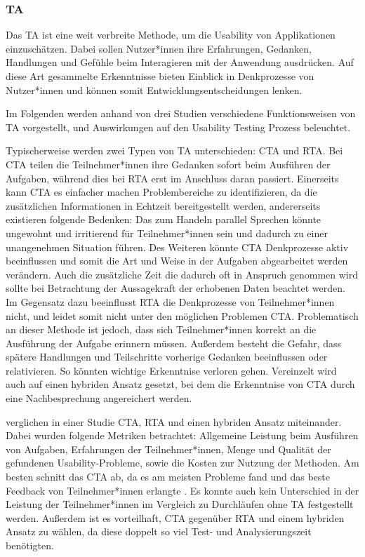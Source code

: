 \parencite{barnumUsabilityTesting2021}

\subsubsection{\acl{TA}}
Das \ac{TA} ist eine weit verbreite Methode, um die Usability von Applikationen einzuschätzen. Dabei sollen Nutzer*innen ihre Erfahrungen, Gedanken, Handlungen und Gefühle beim Interagieren mit der Anwendung ausdrücken. Auf diese Art gesammelte Erkenntnisse  bieten Einblick in Denkprozesse von Nutzer*innen und können somit Entwicklungsentscheidungen lenken.
\parencite{alhadretiRethinkingThinking2018}

Im Folgenden werden anhand von drei Studien verschiedene Funktionsweisen von \ac{TA} vorgestellt, und Auswirkungen auf den Usability Testing Prozess beleuchtet.

Typischerweise werden zwei Typen von \ac{TA} unterschieden: \ac{CTA} und \ac{RTA}. Bei \ac{CTA} teilen die Teilnehmer*innen ihre Gedanken sofort beim Ausführen der Aufgaben, während dies bei \ac{RTA} erst im Anschluss daran passiert. Einerseits kann \ac{CTA} es einfacher machen Problembereiche zu identifizieren, da die zusätzlichen Informationen in Echtzeit bereitgestellt werden, andererseits existieren folgende Bedenken: Das zum Handeln parallel Sprechen könnte ungewohnt und irritierend für Teilnehmer*innen sein und dadurch zu einer unangenehmen Situation führen. Des Weiteren könnte \ac{CTA} Denkprozesse aktiv beeinflussen und somit die Art und Weise in der Aufgaben abgearbeitet werden verändern. Auch die zusätzliche Zeit die dadurch oft in Anspruch genommen wird sollte bei Betrachtung der Aussagekraft der erhobenen Daten beachtet werden.  Im Gegensatz dazu beeinflusst \ac{RTA} die Denkprozesse von Teilnehmer*innen nicht, und leidet somit nicht unter den möglichen Problemen \ac{CTA}. Problematisch an dieser Methode ist jedoch, dass sich Teilnehmer*innen korrekt an die Ausführung der Aufgabe erinnern müssen. Außerdem besteht die Gefahr, dass spätere Handlungen und Teilschritte vorherige Gedanken beeinflussen oder relativieren. So könnten wichtige Erkenntnise verloren gehen. Vereinzelt wird auch auf einen hybriden Ansatz gesetzt, bei dem die Erkenntnise von \ac{CTA} durch eine Nachbesprechung angereichert werden. \cite{alhadretiRethinkingThinking2018}

\textcite{alhadretiRethinkingThinking2018} verglichen in einer Studie \ac{CTA}, \ac{RTA} und einen hybriden Ansatz miteinander. Dabei wurden folgende Metriken betrachtet: Allgemeine Leistung beim Ausführen von Aufgaben, Erfahrungen der Teilnehmer*innen, Menge und Qualität der gefundenen Usability-Probleme, sowie die Kosten zur Nutzung der Methoden. Am besten schnitt das \acl{CTA} ab, da es am meisten Probleme fand und das beste Feedback von Teilnehmer*innen erlangte . Es konnte auch kein Unterschied in der Leistung der Teilnehmer*innen im Vergleich zu Durchläufen ohne \ac{TA} festgestellt werden. Außerdem ist es vorteilhaft, \ac{CTA} gegenüber \ac{RTA} und einem hybriden Ansatz zu wählen, da diese doppelt so viel Test- und Analysierungszeit benötigten.
\parencite{alhadretiRethinkingThinking2018}

